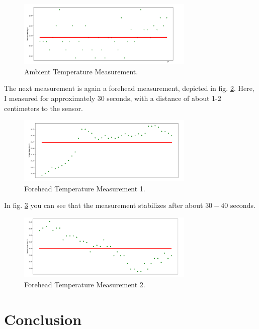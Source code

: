 \documentclass{article}[12pt]
\begin{document}
\begin{figure}[H]
  \caption{Ambient Temperature Measurement.}
  \label{fig:ambienttemp}
  \centering
    \includegraphics[width=0.75\textwidth]{img/ambienttemp.png}
\end{figure}

The next measurement is again a forehead measurement, depicted in fig. \ref{fig:foreheadtemp1}. Here, I measured for approximately $30$ seconds, with a distance of about 1-2 centimeters to the sensor.

\begin{figure}[H]
  \caption{Forehead Temperature Measurement 1.}
  \label{fig:foreheadtemp1}
  \centering
    \includegraphics[width=0.75\textwidth]{img/foreheadtemp1.png}
\end{figure}

In fig. \ref{fig:foreheadtemp2} you can see that the measurement stabilizes after about $30-40$ seconds. 

\begin{figure}[H]
  \caption{Forehead Temperature Measurement 2.}
  \label{fig:foreheadtemp2}
  \centering
    \includegraphics[width=0.75\textwidth]{img/foreheadtemp2.png}
\end{figure}

\section{Conclusion}
\end{document}
